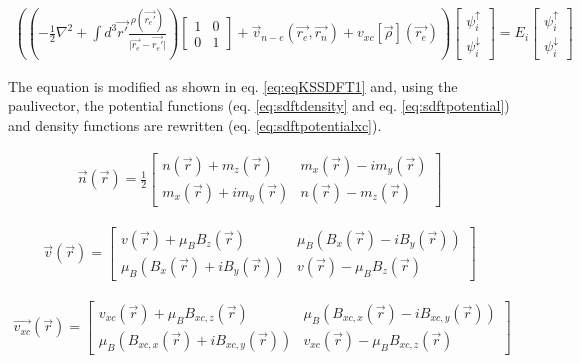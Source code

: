 \begin{equation}
\begin{split}
\left(\left(-\frac{1}{2} \nabla^2  + \int d^3\vec{r'} \frac{\rho(\vec{r_{e}'})}{\lvert \vec{r_{e}} - \vec{r_{e}'} \rvert} \right) \begin{bmatrix} 1 & 0 \\ 0 & 1 \end{bmatrix} + \vec{v}_{n-e}(\vec{r_e}, \vec{r_n}) + v_{xc}[\vec{\rho}](\vec{r_{e}}) \right) \begin{bmatrix} \psi^{\uparrow}_{i} \\ \psi^{\downarrow}_{i} \end{bmatrix} = E_i \begin{bmatrix} \psi^{\uparrow}_{i} \\ \psi^{\downarrow}_{i} \end{bmatrix} 
\label{eq:eqKSSDFT1}
\end{split}
\end{equation}

The equation is modified as shown in eq. \ref{eq:eqKSSDFT1} and, using the \gls{paulivector}, the potential functions (eq. \ref{eq:sdftdensity} and eq. \ref{eq:sdftpotential})\cite{spindft4} and density functions are rewritten (eq. \ref{eq:sdftpotentialxc})\cite{spindft4}.

\begin{equation}
\begin{split}
\vec{n}(\vec{r}) = \frac{1}{2} \begin{bmatrix} n(\vec{r}) + m_z(\vec{r}) & m_x(\vec{r}) - i m_y(\vec{r}) \\ m_x(\vec{r}) + i m_y(\vec{r}) & n(\vec{r}) - m_z(\vec{r}) \end{bmatrix}
\label{eq:sdftdensity}
\end{split}
\end{equation}

\begin{equation}
\begin{split}
\vec{v}(\vec{r}) = \begin{bmatrix} v(\vec{r}) + \mu_B B_z(\vec{r}) & \mu_B (B_x(\vec{r}) - i B_y(\vec{r})) \\ \mu_B (B_x(\vec{r}) + i B_y(\vec{r})) & v(\vec{r}) - \mu_B B_z(\vec{r}) \end{bmatrix}
\label{eq:sdftpotential}
\end{split}
\end{equation}

\begin{equation}
\begin{split}
\vec{v_{xc}}(\vec{r}) = \begin{bmatrix} v_{xc}(\vec{r}) + \mu_B B_{xc, z}(\vec{r}) & \mu_B (B_{xc, x}(\vec{r}) - i B_{xc, y}(\vec{r})) \\ \mu_B (B_{xc, x}(\vec{r}) + i B_{xc, y}(\vec{r})) & v_{xc}(\vec{r}) - \mu_B B_{xc, z}(\vec{r}) \end{bmatrix}
\label{eq:sdftpotentialxc}
\end{split}
\end{equation}

